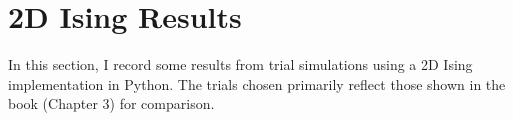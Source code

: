 \documentclass{article}
\begin{document}
\section{2D Ising Results}
In this section, I record some results from trial simulations using a 2D Ising implementation in Python. The trials chosen primarily
reflect those shown in the book (Chapter 3) for comparison.
\begin{figure}
\centering
{}
\hspace{0mm}
\end{figure}
\end{document}
